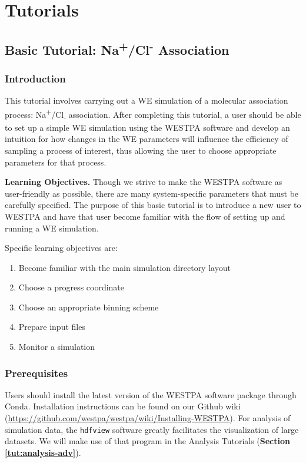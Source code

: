 \section{Tutorials}

\subsection{Basic Tutorial: Na\textsuperscript{+}/Cl\textsuperscript{-} Association}
\label{tut:nacl-basic}

\subsubsection{Introduction}

This tutorial involves carrying out a WE simulation of a molecular association process: Na\textsuperscript{+}/Cl\textsubscript{-} association. 
After completing this tutorial, a user should be able to set up a simple WE simulation using the WESTPA software and develop an intuition for how changes in the WE parameters will influence the efficiency of sampling a process of interest, thus allowing the user to choose appropriate parameters for that process.

\textbf{Learning Objectives.} Though we strive to make the WESTPA software as user-friendly as possible, there are many system-specific parameters that must be carefully specified. 
The purpose of this basic tutorial is to introduce a new user to WESTPA and have that user become familiar with the flow of setting up and running a WE simulation.   

\noindent Specific learning objectives are:
\begin{enumerate}
\item Become familiar with the main simulation directory layout
\item Choose a progress coordinate
\item Choose an appropriate binning scheme
\item Prepare input files
\item Monitor a simulation
\end{enumerate}

\subsubsection{Prerequisites}

Users should install the latest version of the WESTPA software package through Conda. 
Installation instructions can be found on our Github wiki (\url{https://github.com/westpa/westpa/wiki/Installing-WESTPA}). 
For analysis of simulation data, the \verb|hdfview| software greatly facilitates the visualization of large datasets. 
We will make use of that program in the Analysis Tutorials (\textbf{Section \ref{tut:analysis-adv}}).

